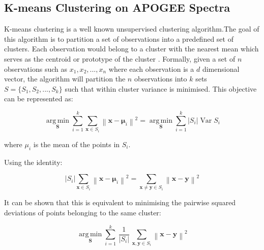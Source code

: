 \subsection{K-means Clustering on APOGEE Spectra}

K-means clustering is a well known unsupervised clustering algorithm.The goal of this algorithm is to partition a set of observations into a predefined set of clusters. Each observation would belong to a cluster with the nearest mean which serves as the centroid or prototype of the cluster \cite{macqueen1967some}. Formally, given a set of $n$ observations such as \(x_1,x_2,...,x_n\) where each observation is a $d$ dimensional vector, the algorithm will partition the $n$ observations into $k$ sets $S=\{S_1,S_2,...,S_k\}$ such that within cluster variance is minimised. This objective can be represented as:

\begin{equation}
{\underset {\mathbf {S} }{\operatorname {arg\,min} }}\sum _{i=1}^{k}\sum _{\mathbf {x} \in S_{i}}\left\|\mathbf {x} -{\boldsymbol {\mu }}_{i}\right\|^{2}={\underset {\mathbf {S} }{\operatorname {arg\,min} }}\sum _{i=1}^{k}|S_{i}|\operatorname {Var} S_{i}
\end{equation}

where $\mu_i$ is the mean of the points in $S_i$. 

Using the identity:

\begin{equation}
    |S_{i}|\sum _{\mathbf {x} \in S_{i}}\left\|\mathbf {x} -{\boldsymbol {\mu }}_{i}\right\|^{2}=\sum _{\mathbf {x} \neq \mathbf {y} \in S_{i}}\left\|\mathbf {x} -\mathbf {y} \right\|^{2}
\end{equation}

It can be shown that this is equivalent to minimising the pairwise squared deviations of points belonging to the same cluster:

\begin{equation}
{\underset {\mathbf {S} }{\operatorname {arg\,min} }}\sum _{i=1}^{k}\,{\frac {1}{|S_{i}|}}\,\sum _{\mathbf {x} ,\mathbf {y} \in S_{i}}\left\|\mathbf {x} -\mathbf {y} \right\|^{2}
\end{equation}


